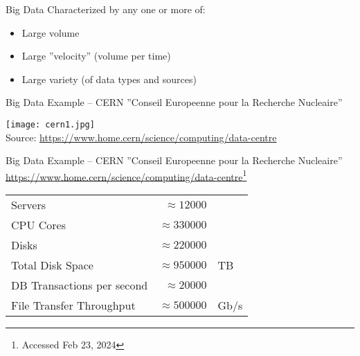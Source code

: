 \documentclass[ignorenonframetext,xcolor=x11names]{beamer}
\begin{document}
\begin{frame}{Big Data}
Characterized by any one or more of:
\begin{itemize}
    \item Large volume
    \item Large ''velocity'' (volume per time)
    \item Large variety (of data types and sources)
\end{itemize}
\end{frame}

\begin{frame}{Big Data Example -- CERN}
''Conseil Europeenne pour la Recherche Nucleaire'' \\

\begin{center}
\texttt{[image: cern1.jpg]} \\

\footnotesize{Source: \url{https://www.home.cern/science/computing/data-centre}}
\end{center}

\end{frame}


\begin{frame}{Big Data Example -- CERN}
''Conseil Europeenne pour la Recherche Nucleaire'' \\

\footnotesize\url{https://www.home.cern/science/computing/data-centre}\footnote{Accessed Feb 23, 2024}\small
\begin{center}
\renewcommand{\arraystretch}{1.5}
\begin{tabular}{l r l} \hline
Servers & $\approx 12000$ \\
CPU Cores & $\approx 330000$ \\
Disks & $\approx 220000$ \\
Total Disk Space & $\approx 950000$ & TB \\ 
DB Transactions per second & $\approx 20000$ \\ 
File Transfer Throughput & $\approx 500000$ & Gb/s\\  \hline
\end{tabular}
\end{center}
\end{frame}
\end{document}
